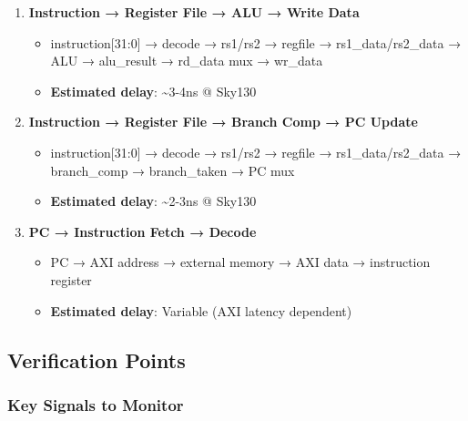 \begin{record}

\begin{enumerate}
\def\labelenumi{\arabic{enumi}.}
\item
  \textbf{Instruction → Register File → ALU → Write Data}

  \begin{itemize}
  \tightlist
  \item
    instruction{[}31:0{]} → decode → rs1/rs2 → regfile →
    rs1\_\allowbreak{}data/\allowbreak{}rs2\_\allowbreak{}data → ALU →
    alu\_\allowbreak{}result → rd\_data mux → wr\_data
  \item
    \textbf{Estimated delay}: \textasciitilde3-4ns @ Sky130
  \end{itemize}
\item
  \textbf{Instruction → Register File → Branch Comp → PC Update}

  \begin{itemize}
  \tightlist
  \item
    instruction{[}31:0{]} → decode → rs1/rs2 → regfile →
    rs1\_\allowbreak{}data/\allowbreak{}rs2\_\allowbreak{}data →
    branch\_\allowbreak{}comp → branch\_\allowbreak{}taken → PC mux
  \item
    \textbf{Estimated delay}: \textasciitilde2-3ns @ Sky130
  \end{itemize}
\item
  \textbf{PC → Instruction Fetch → Decode}

  \begin{itemize}
  \tightlist
  \item
    PC → AXI address → external memory → AXI data → instruction register
  \item
    \textbf{Estimated delay}: Variable (AXI latency dependent)
  \end{itemize}
\end{enumerate}

\end{record}

\subsection{Verification Points}\label{cr:fix:cpu-dataflow-diagram:verification-points}

\subsubsection{Key Signals to Monitor}\label{cr:fix:cpu-dataflow-diagram:key-signals-to-monitor}

